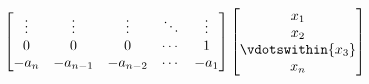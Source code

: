 \documentclass{article}
\begin{document}
\begin{theorem}
\begin{equation*}
\begin{bmatrix}
            \vdots & \vdots   & \vdots   & \ddots & \vdots \\
            0      & 0        & 0        & \cdots & 1      \\
            -a_n   & -a_{n-1} & -a_{n-2} & \cdots & -a_1
        \end{bmatrix}
        \begin{bmatrix}
            x_1               \\
            x_2               \\
            \vdotswithin{x_3} \\
            x_n
        \end{bmatrix}
    \end{equation*}
\end{theorem}
\newpage
%
\listoffigures
%
\newpage
%
\nocite{*}
%


%
\end{document}

